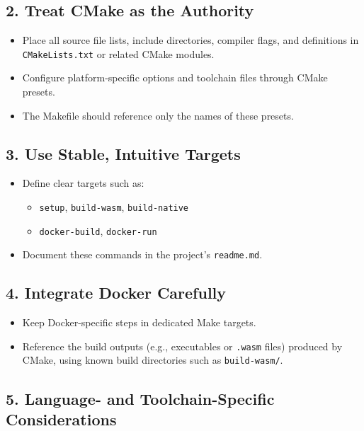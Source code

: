 \documentclass[11pt]{article}
\begin{document}
\subsection*{2. Treat CMake as the Authority}

\begin{itemize}[noitemsep]
  \item Place all source file lists, include directories, compiler flags, and definitions in \texttt{CMakeLists.txt} or related CMake modules.
  \item Configure platform-specific options and toolchain files through CMake presets.
  \item The Makefile should reference only the names of these presets.
\end{itemize}

\subsection*{3. Use Stable, Intuitive Targets}

\begin{itemize}[noitemsep]
  \item Define clear targets such as:
    \begin{itemize}[noitemsep]
      \item \texttt{setup}, \texttt{build-wasm}, \texttt{build-native}
      \item \texttt{docker-build}, \texttt{docker-run}
    \end{itemize}
  \item Document these commands in the project's \texttt{readme.md}.
\end{itemize}

\subsection*{4. Integrate Docker Carefully}

\begin{itemize}[noitemsep]
  \item Keep Docker-specific steps in dedicated Make targets.
  \item Reference the build outputs (e.g., executables or \texttt{.wasm} files) produced by CMake, using known build directories such as \texttt{build-wasm/}.
\end{itemize}

\subsection*{5. Language- and Toolchain-Specific Considerations}
\end{document}
